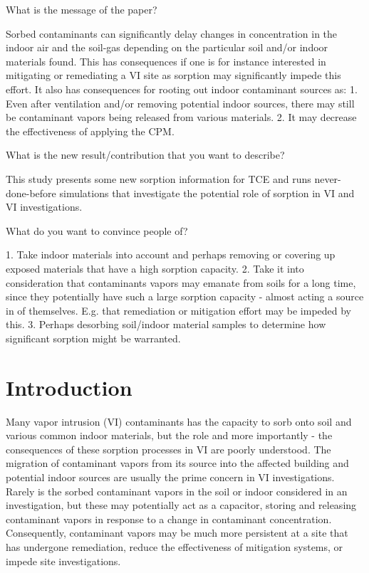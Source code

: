 \begin{comments}

What is the message of the paper?

Sorbed contaminants can significantly delay changes in concentration in the indoor air and the soil-gas depending on the particular soil and/or indoor materials found.
This has consequences if one is for instance interested in mitigating or remediating a VI site as sorption may significantly impede this effort.
It also has consequences for rooting out indoor contaminant sources as:
1. Even after ventilation and/or removing potential indoor sources, there may still be contaminant vapors being released from various materials.
2. It may decrease the effectiveness of applying the CPM.

What is the new result/contribution that you want to describe?

This study presents some new sorption information for TCE and runs never-done-before simulations that investigate the potential role of sorption in VI and VI investigations.

What do you want to convince people of?

1. Take indoor materials into account and perhaps removing or covering up exposed materials that have a high sorption capacity.
2. Take it into consideration that contaminants vapors may emanate from soils for a long time, since they potentially have such a large sorption capacity - almost acting a source in of themselves. E.g. that remediation or mitigation effort may be impeded by this.
3. Perhaps desorbing soil/indoor material samples to determine how significant sorption might be warranted.

\end{comments}

\section{Introduction}\label{sec:intro}

Many vapor intrusion (VI) contaminants has the capacity to sorb onto soil and various common indoor materials, but the role and more importantly - the consequences of these sorption processes in VI are poorly understood.
The migration of contaminant vapors from its source into the affected building and potential indoor sources are usually the prime concern in VI investigations.
Rarely is the sorbed contaminant vapors in the soil or indoor considered in an investigation, but these may potentially act as a capacitor, storing and releasing contaminant vapors in response to a change in contaminant concentration.
Consequently, contaminant vapors may be much more persistent at a site that has undergone remediation, reduce the effectiveness of mitigation systems, or impede site investigations.\par

